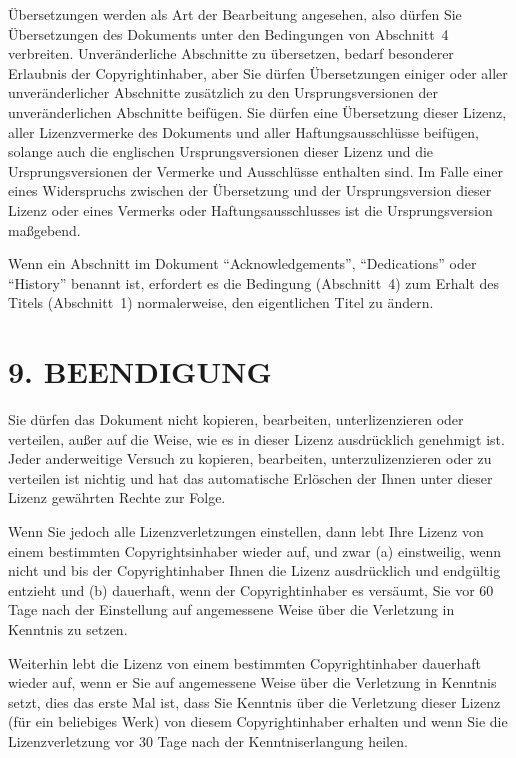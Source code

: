 Übersetzungen werden als Art der Bearbeitung angesehen, also dürfen Sie
Übersetzungen des Dokuments unter den Bedingungen von Abschnitt~4 verbreiten.
Unveränderliche Abschnitte zu übersetzen, bedarf besonderer Erlaubnis der 
Copyrightinhaber, aber Sie dürfen Übersetzungen einiger oder aller unveränderlicher
Abschnitte zusätzlich zu den Ursprungsversionen der unveränderlichen Abschnitte beifügen.
Sie dürfen eine Übersetzung dieser Lizenz, aller Lizenzvermerke des Dokuments
und aller Haftungsausschlüsse beifügen, solange auch die englischen Ursprungsversionen dieser
Lizenz und die Ursprungsversionen der Vermerke und Ausschlüsse enthalten sind.
Im Falle einer eines Widerspruchs zwischen der Übersetzung und der Ursprungsversion
dieser Lizenz oder eines Vermerks oder Haftungsausschlusses ist die Ursprungsversion
maßgebend.

Wenn ein Abschnitt im Dokument "`Acknowledgements"', "`Dedications"'
oder "`History"' benannt ist, erfordert es die Bedingung (Abschnitt~4) zum Erhalt des Titels
(Abschnitt~1) normalerweise, den eigentlichen Titel zu ändern.


\section*{9. BEENDIGUNG}

Sie dürfen das Dokument nicht kopieren, bearbeiten, unterlizenzieren oder verteilen, 
außer auf die Weise, wie es in dieser Lizenz ausdrücklich genehmigt ist. Jeder anderweitige Versuch
zu kopieren, bearbeiten, unterzulizenzieren oder zu verteilen ist nichtig und hat
das automatische Erlöschen der Ihnen unter dieser Lizenz gewährten Rechte zur Folge.

Wenn Sie jedoch alle Lizenzverletzungen einstellen, dann lebt Ihre Lizenz
von einem bestimmten Copyrightsinhaber wieder auf, und zwar (a) einstweilig,
wenn nicht und bis der Copyrightinhaber Ihnen die Lizenz ausdrücklich und endgültig
entzieht und (b) dauerhaft, wenn der Copyrightinhaber es versäumt, Sie vor 60 Tage
nach der Einstellung auf angemessene Weise über die Verletzung in Kenntnis zu setzen.

Weiterhin lebt die Lizenz von einem bestimmten Copyrightinhaber dauerhaft wieder auf,
wenn er Sie auf angemessene Weise über die Verletzung in Kenntnis setzt, dies 
das erste Mal ist, dass Sie Kenntnis über die Verletzung dieser Lizenz (für ein beliebiges Werk) von diesem 
Copyrightinhaber erhalten und wenn Sie die Lizenzverletzung vor 30 Tage nach der
Kenntniserlangung heilen.

